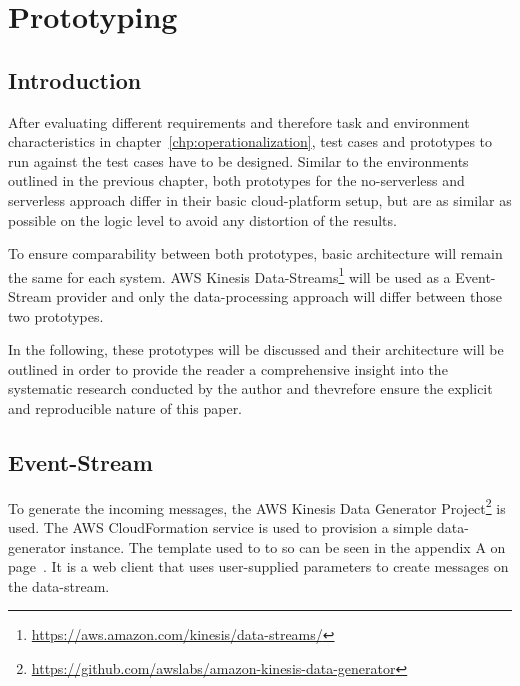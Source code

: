 \chapter{Prototyping}\label{chp:prototyping}


\section{Introduction}

After evaluating different requirements and therefore task and environment characteristics in chapter~\vref{chp:operationalization}, test cases and prototypes to run against the test cases have to be designed. Similar to the environments outlined in the previous chapter, both prototypes for the no-serverless and serverless approach differ in their basic cloud-platform setup, but are as similar as possible on the logic level to avoid any distortion of the results.

To ensure comparability between both prototypes, basic architecture will remain the same for each system. AWS Kinesis Data-Streams\footnote{\url{https://aws.amazon.com/kinesis/data-streams/}} will be used as a Event-Stream provider and only the data-processing approach will differ between those two prototypes. 

In the following, these prototypes will be discussed and their architecture will be outlined in order to provide the reader a comprehensive insight into the systematic research conducted by the author and thevrefore ensure the explicit and reproducible nature of this paper. 



\section{Event-Stream}\label{chp:protoEvent-Stream}

To generate the incoming messages, the AWS Kinesis Data Generator Project\footnote{\url{https://github.com/awslabs/amazon-kinesis-data-generator}} is used. The AWS CloudFormation service is used to provision a simple data-generator instance. The template used to to so can be seen in the appendix A on page~\pageref{app:cloudformation}. It is a web client that uses user-supplied parameters to create messages on the data-stream. 

